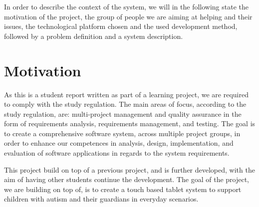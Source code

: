 In order to describe the context of the system, we will in the following state the motivation of the project, the group of people we are aiming at helping and their issues, the technological platform chosen and the used development method, followed by a problem definition and a system description.

\section{Motivation}
As this is a student report written as part of a learning project, we are required to comply with the study regulation.
The main areas of focus, according to the study regulation, are: multi-project management and quality assurance in the form of requirements analysis, requirements management, and testing.
The goal is to create a comprehensive software system, across multiple project groups, in order to enhance our competences in analysis, design, implementation, and evaluation of software applications in regards to the system requirements\cite{studyreg}.

This project build on top of a previous project, and is further developed, with the aim of having other students continue the development.
The goal of the project, we are building on top of, is to create a touch based tablet system to support children with autism and their guardians in everyday scenarios.